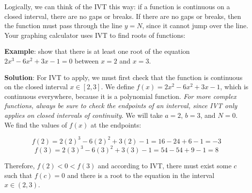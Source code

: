 Logically, we can think of the IVT this way: if a function is continuous on a 
closed interval, there are no gaps or breaks. If there are no gaps or breaks, 
then the function must pass through the line $y=N$, since it cannot jump over 
the line. Your graphing calculator uses IVT to find roots of functions: 

\textbf{Example}: show that there is at least one root of the equation $2x^3 - 
6x^2 + 3x - 1 = 0$ between $x = 2$ and $x = 3$.

\textbf{Solution}: For IVT to apply, we must first check that the function is 
continuous on the closed interval $x \in \left[2, 3\right]$. We define $f(x) = 
2x^2-6x^2+3x-1$, which is continuous everywhere, because it is a polynomial 
function. \textit{For more complex functions, always be sure to check the 
endpoints of an interval, since IVT only applies on closed intervals of 
continuity}. We will take $a = 2$, $b = 3$, and $N = 0$. We find the values of 
$f(x)$ at the endpoints: 

$$f(2) = 2(2)^3 - 6(2)^2 + 3(2) - 1 = 16 - 24 + 6 - 1 = -3$$
$$f(3) = 2(3)^3 - 6(3)^2 + 3(3) - 1 = 54 - 54 + 9 - 1 = 8$$

Therefore, $f(2)<0<f(3)$ and according to IVT, there must exist some $c$ such 
that $f(c) = 0$ and there is a root to the equation in the interval $x \in 
\left(2, 3\right)$.

